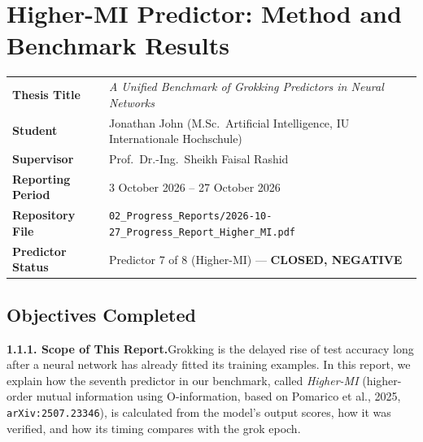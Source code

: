 \documentclass[11pt,a4paper,oneside]{report}
\begin{document}
\chapter{Higher-MI Predictor: Method and Benchmark Results}

\begin{center}
\small
\begin{tabularx}{\textwidth}{>{\bfseries}p{1.65in} X}
\toprule
Thesis Title & \emph{A Unified Benchmark of Grokking Predictors in Neural Networks}\\
Student & Jonathan John (M.Sc.\ Artificial Intelligence, IU Internationale Hochschule)\\
Supervisor & Prof.\ Dr.-Ing.\ Sheikh Faisal Rashid\\
Reporting Period & 3 October 2026 -- 27 October 2026\\
Repository File & \texttt{02\_Progress\_Reports/2026-10-27\_Progress\_Report\_Higher\_MI.pdf}\\
Predictor Status & Predictor 7 of 8 (Higher-MI) --- \textbf{CLOSED, NEGATIVE}\\
\bottomrule
\end{tabularx}
\end{center}

\section{Objectives Completed}

\noindent\textbf{1.1.1. Scope of This Report.}\quad Grokking is the delayed rise of test accuracy long after a neural network has already fitted its training examples. In this report, we explain how the seventh predictor in our benchmark, called \emph{Higher-MI} (higher-order mutual information using O-information, based on Pomarico et al., 2025, \texttt{arXiv:2507.23346}), is calculated from the model's output scores, how it was verified, and how its timing compares with the grok epoch.
\end{document}
